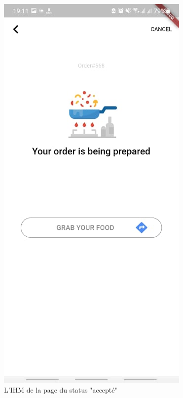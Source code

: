\documentclass[french, a4paper, 12pt]{report}
\begin{document}
\begin{figure}[h!]
  \caption{L'IHM de la page du status "accepté"}\label{fig:orderconfirm}
\endminipage\hfill
{}
  \includegraphics[width=\linewidth]{screenshots/ClientViews/orderprep.jpg}

\end{figure}
\end{document}
